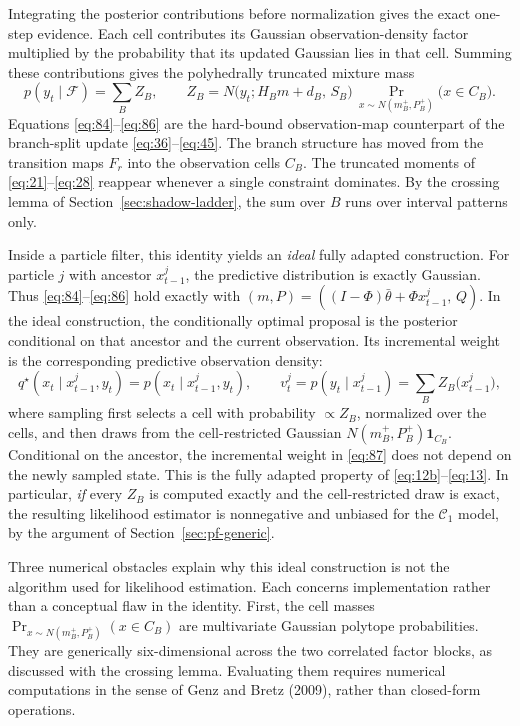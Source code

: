 \documentclass[11pt]{article}
\begin{document}
Integrating the posterior contributions before normalization gives the exact one-step evidence. Each cell contributes its Gaussian observation-density factor multiplied by the probability that its updated Gaussian lies in that cell. Summing these contributions gives the polyhedrally truncated mixture mass
\begin{equation}\label{eq:86}
 p(y_t\mid\mathcal F)=\sum_B Z_B,
 \qquad
 Z_B=N\!\bigl(y_t;H_Bm+d_B,\,S_B\bigr)\,
 \Pr_{x\sim N(m_B^+,P_B^+)}\!\bigl(x\in C_B\bigr).
\end{equation}
Equations \eqref{eq:84}--\eqref{eq:86} are the hard-bound observation-map counterpart of the branch-split update \eqref{eq:36}--\eqref{eq:45}. The branch structure has moved from the transition maps \(F_r\) into the observation cells \(C_B\). The truncated moments of \eqref{eq:21}--\eqref{eq:28} reappear whenever a single constraint dominates. By the crossing lemma of Section~\ref{sec:shadow-ladder}, the sum over \(B\) runs over interval patterns only.

Inside a particle filter, this identity yields an \emph{ideal} fully adapted construction. For particle \(j\) with ancestor \(x_{t-1}^j\), the predictive distribution is exactly Gaussian. Thus \eqref{eq:84}--\eqref{eq:86} hold exactly with \((m,P)=((I-\Phi)\bar\theta+\Phi x_{t-1}^j,\,Q)\). In the ideal construction, the conditionally optimal proposal is the posterior conditional on that ancestor and the current observation. Its incremental weight is the corresponding predictive observation density:
\begin{equation}\label{eq:87}
 q^\star(x_t\mid x_{t-1}^j,y_t)=p(x_t\mid x_{t-1}^j,y_t),
 \qquad
 v_t^j=p(y_t\mid x_{t-1}^j)=\sum_B Z_B\bigl(x_{t-1}^j\bigr),
\end{equation}
where sampling first selects a cell with probability \(\propto Z_B\), normalized over the cells, and then draws from the cell-restricted Gaussian \(N(m_B^+,P_B^+)\mathbf 1_{C_B}\). Conditional on the ancestor, the incremental weight in \eqref{eq:87} does not depend on the newly sampled state. This is the fully adapted property of \eqref{eq:12b}--\eqref{eq:13}. In particular, \emph{if} every \(Z_B\) is computed exactly and the cell-restricted draw is exact, the resulting likelihood estimator is nonnegative and unbiased for the \(\mathcal C_1\) model, by the argument of Section~\ref{sec:pf-generic}.

Three numerical obstacles explain why this ideal construction is not the algorithm used for likelihood estimation. Each concerns implementation rather than a conceptual flaw in the identity. First, the cell masses \(\Pr_{x\sim N(m_B^+,P_B^+)}(x\in C_B)\) are multivariate Gaussian polytope probabilities. They are generically six-dimensional across the two correlated factor blocks, as discussed with the crossing lemma. Evaluating them requires numerical computations in the sense of Genz and Bretz (2009), rather than closed-form operations.
\end{document}
